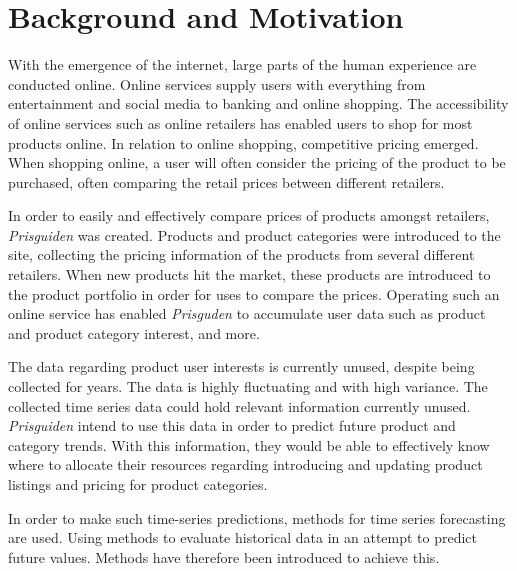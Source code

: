 \section{Background and Motivation}\label{cit}
\label{section:Introduction:BackgroundAndMotivation}


With the emergence of the internet, large parts of the human experience are conducted online.
Online services supply users with everything from entertainment and social media to banking and online shopping.
The accessibility of online services such as online retailers has enabled users to shop for most products online.
In relation to online shopping, competitive pricing emerged.
When shopping online, a user will often consider the pricing of the product to be purchased, often comparing the retail prices between different retailers.


In order to easily and effectively compare prices of products amongst retailers,
\textit{Prisguiden} was created.
Products and product categories were introduced to the site, collecting the pricing information of the products from several different retailers.
When new products hit the market, these products are introduced to the product portfolio in order for uses to compare the prices.
Operating such an online service has enabled \textit{Prisguden} to accumulate user data such as product and product category interest, and more.

The data regarding product user interests is currently unused, despite being collected for years.
The data is highly fluctuating and with high variance.
The collected time series data could hold relevant information currently unused.
\textit{Prisguiden} intend to use this data in order to predict future product and category trends.
With this information, they would be able to effectively know where to allocate their resources regarding introducing and updating product listings and pricing for product categories.
\linebreak


In order to make such time-series predictions, methods for time series forecasting are used.
Using methods to evaluate historical data in an attempt to predict future values.
Methods have therefore been introduced to achieve this.


